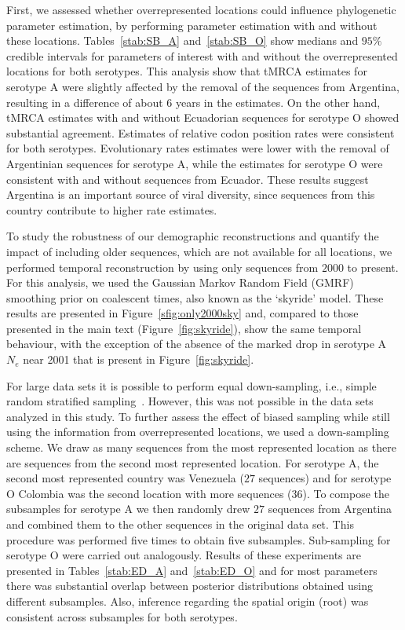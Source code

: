 \documentclass[a4paper,10pt]{article}
\begin{document}
First, we assessed whether overrepresented locations could influence phylogenetic parameter estimation, by performing parameter estimation with and without these locations.
Tables~\ref{stab:SB_A} and~\ref{stab:SB_O} show medians and $95 \%$ credible intervals for parameters of interest with and without the overrepresented locations for both serotypes.
This analysis show that tMRCA estimates for serotype A were slightly affected by the removal of the sequences from Argentina, resulting in a difference of about 6 years in the estimates.
On the other hand, tMRCA estimates with and without Ecuadorian sequences for serotype O showed substantial agreement.
Estimates of relative codon position rates were consistent for both serotypes.
Evolutionary rates estimates were lower with the removal of Argentinian sequences for serotype A, while the estimates for serotype O were consistent with and without sequences from Ecuador. 
These results suggest Argentina is an important source of viral diversity, since sequences from this country contribute to higher rate estimates.

To study the robustness of our demographic reconstructions and quantify the impact of including older sequences, which are not available for all locations, we performed temporal reconstruction by using only sequences from $2000$ to present.
For this analysis, we used the Gaussian Markov Random Field (GMRF) smoothing prior \cite{M-skyride} on coalescent times, also known as the `skyride' model.
These results are presented in Figure~\ref{sfig:only2000sky} and, compared to those presented in the main text (Figure~\ref{fig:skyride}), show the same temporal behaviour, with the exception of the absence of the marked drop in serotype A $N_e$ near 2001 that is present in Figure~\ref{fig:skyride}.

For large data sets it is possible to perform equal down-sampling, i.e., simple random stratified sampling~\cite{M-fluPNAS}.
However, this was not possible in the data sets analyzed in this study.
To further assess the effect of biased sampling while still using the information from overrepresented locations, we used a down-sampling scheme.
We draw as many sequences from the most represented location as there are sequences from the second most represented location.
For serotype A, the second most represented country was Venezuela ($27$ sequences) and for serotype O Colombia was the second location with more sequences ($36$).
To compose the subsamples for serotype A we then randomly drew $27$ sequences from Argentina and combined them to the other sequences in the original data set.
This procedure was performed five times to obtain five subsamples.
Sub-sampling for serotype O were carried out analogously.
Results of these experiments are presented in Tables~\ref{stab:ED_A} and~\ref{stab:ED_O} and for most parameters there was substantial overlap between posterior distributions obtained using different subsamples.
Also, inference regarding the spatial origin (root) was consistent across subsamples for both serotypes.
\end{document}
